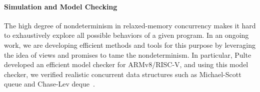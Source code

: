 \paragraph{Simulation and Model Checking}

The high degree of nondeterminism in relaxed-memory concurrency makes it hard to exhaustively
explore all possible behaviors of a given program.  In an ongoing work, we are developing efficient
methods and tools for this purpose by leveraging the idea of views and promises to tame the
nondeterminism.  In particular, Pulte~\etal{} developed an efficient model checker for ARMv8/RISC-V,
and using this model checker, we verified realistic concurrent data structures such as Michael-Scott
queue and Chase-Lev deque~\cite{promising-arm}.








